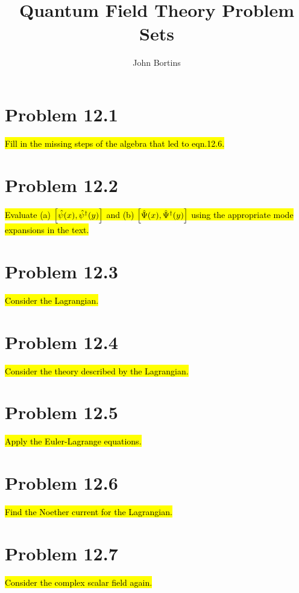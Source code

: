 \documentclass{article}
\title{Quantum Field Theory Problem Sets}
\author{John Bortins}
\begin{document}
\maketitle{}



\section*{Problem 12.1}
\begin{quoting}
    \hl{Fill in the missing steps of the algebra that led to eqn.12.6.}
\end{quoting}


\section*{Problem 12.2}
\begin{quoting}
    \hl{Evaluate (a) $\bqty{\hat{\psi}(x),\hat{\psi}^\dagger (y)}$ and (b) $\bqty{\hat{\Psi}(x),\hat{\Psi}^\dagger (y)}$ using the appropriate mode expansions in the text.}
\end{quoting}


\section*{Problem 12.3}
\begin{quoting}
    \hl{Consider the Lagrangian.}
\end{quoting}


\section*{Problem 12.4}
\begin{quoting}
    \hl{Consider the theory described by the Lagrangian.}
\end{quoting}


\section*{Problem 12.5}
\begin{quoting}
    \hl{Apply the Euler-Lagrange equations.}
\end{quoting}


\section*{Problem 12.6}
\begin{quoting}
    \hl{Find the Noether current for the Lagrangian.}
\end{quoting}


\section*{Problem 12.7}
\begin{quoting}
    \hl{Consider the complex scalar field again.}
\end{quoting}
\end{document}

